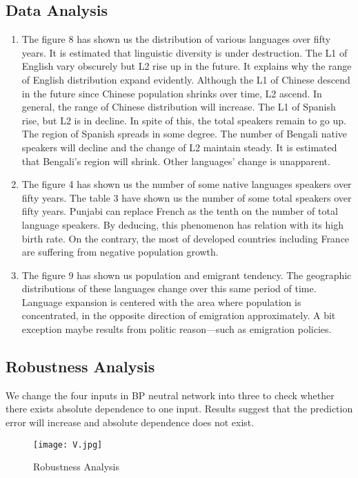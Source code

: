 \documentclass{mcmthesis}
\begin{document}
\subsection{Data Analysis}
\begin{enumerate}[A]
\item The figure 8 has shown us the distribution of various languages over fifty years. It is estimated that linguistic diversity is under destruction. The L1 of English vary obscurely but L2 rise up in the future. It explains why the range of English distribution expand evidently. Although the L1 of Chinese descend in the future since Chinese population shrinks over time, L2 ascend. In general, the range of Chinese distribution will increase. The L1 of Spanish rise, but L2 is in decline. In spite of this, the total speakers remain to go up. The region of Spanish spreads in some degree. The number of Bengali native speakers will decline and the change of L2 maintain steady. It is estimated that Bengali's region will shrink. Other languages' change is unapparent.
\item The figure 4 has shown us the number of some native languages speakers over fifty years. The table 3 have shown us the number of some total speakers over fifty years. Punjabi can replace French as the tenth on the number of total language speakers. By deducing, this phenomenon has relation with its high birth rate. On the contrary, the most of developed countries including France are suffering from negative population growth. 
\item The figure 9 has shown us population and emigrant tendency. The geographic distributions of these languages change over this same period of time. Language expansion is centered with the area where population is concentrated, in the opposite direction of emigration approximately. A bit exception maybe results from politic reason---such as emigration policies.
\end{enumerate}

\subsection{Robustness Analysis}
We change the four inputs in BP neutral network into three to check whether there exists absolute dependence to one input. Results suggest that the prediction error will increase and absolute dependence does not exist. 
\begin{figure}[htbp]
\centering
\texttt{[image: V.jpg]}
\caption{Robustness Analysis}
\end{figure}
\end{document}
